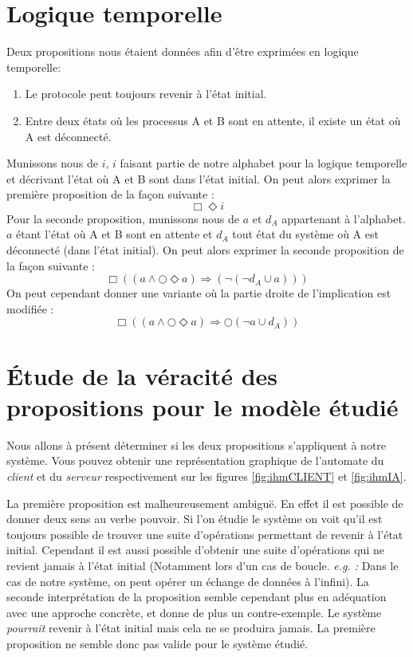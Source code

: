  
 
 
\section{Logique temporelle}

Deux propositions nous étaient données afin d'être exprimées en logique temporelle:
\begin{enumerate}
 \item Le protocole peut toujours revenir à l’état initial.
 \item Entre deux états où les processus A et B sont en attente, il existe un état où A est déconnecté.
\end{enumerate}

Munissons nous de $i$, $i$ faisant partie de notre alphabet pour la logique temporelle et décrivant l'état où A et B sont dans l'état initial. On peut alors exprimer la première proposition de la façon suivante :
\begin{equation}
 \Box\Diamond i
\end{equation}
Pour la seconde proposition, munissons nous de $a$ et $d_A$ appartenant à l'alphabet. $a$ étant l'état où A et B sont en attente et $d_A$ tout état du système où A est déconnecté (dans l'état initial). On peut alors exprimer la seconde proposition de la façon suivante :
\begin{equation}
 \Box((a\wedge\bigcirc\Diamond a)\Longrightarrow(\neg(\neg d_A\cup a)))
\end{equation}
On peut cependant donner une variante où la partie droite de l'implication est modifiée :
\begin{equation}
 \Box((a\wedge\bigcirc\Diamond a)\Longrightarrow\bigcirc(\neg a\cup d_A))
\end{equation}




\section{Étude de la véracité des propositions pour le modèle étudié}
Nous allons à présent déterminer si les deux propositions s'appliquent à notre système. Vous pouvez obtenir une représentation graphique de l'automate du \emph{client} et du \emph{serveur} respectivement sur les figures \ref{fig:ihmCLIENT} et \ref{fig:ihmIA}.

La première proposition est malheureusement ambiguë. En effet il est possible de donner deux sens au verbe \og pouvoir\fg . Si l'on étudie le système on voit qu'il est toujours possible de trouver une suite d'opérations permettant de revenir à l'état initial. Cependant il est aussi possible d'obtenir une suite d'opérations qui ne revient jamais à l'état initial (Notamment lors d'un cas de boucle. \emph{e.g. :} Dans le cas de notre système, on peut opérer un échange de données à l'infini).
La seconde interprétation de la proposition semble cependant plus en adéquation avec une approche concrète, et donne de plus un contre-exemple. Le système \emph{pourrait} revenir à l'état initial mais cela ne se produira jamais. La première proposition ne semble donc pas valide pour le système étudié.

